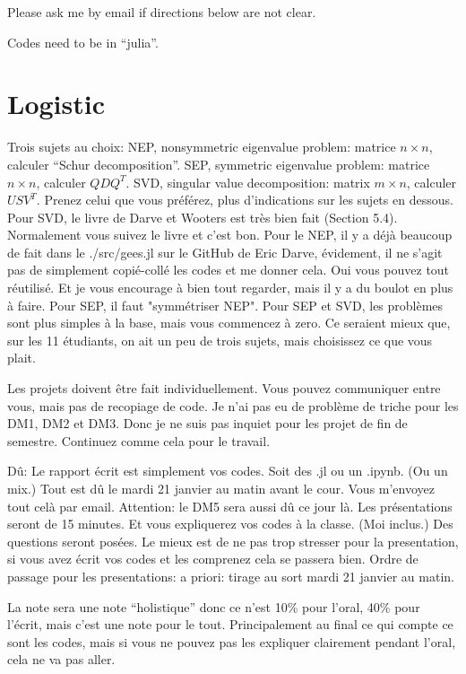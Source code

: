 \documentclass[11pt,letterpaper]{article}
\begin{document}
Please ask me by email if directions below are not clear.

Codes need to be in ``julia''.
 
\section*{Logistic}

Trois sujets au choix: NEP, nonsymmetric eigenvalue problem: matrice $n \times
n$, calculer ``Schur decomposition''.  SEP, symmetric eigenvalue problem:
matrice $n \times n$, calculer $Q D Q^T$.  SVD, singular value decomposition:
matrix $m \times n$, calculer $U S V ^T$.  Prenez celui que vous préférez, plus
d’indications sur les sujets en dessous. Pour SVD, le livre de Darve et Wooters
est très bien fait (Section 5.4). Normalement vous suivez le livre et c’est
bon. Pour le NEP, il y a déjà beaucoup de fait dans le ./src/gees.jl sur le
GitHub de Eric Darve, évidement, il ne s’agit pas de simplement copié-collé les
codes et me donner cela. Oui vous pouvez tout réutilisé. Et je vous encourage à
bien tout regarder, mais il y a du boulot en plus à faire. Pour SEP, il faut
"symmétriser NEP".  Pour SEP et SVD, les problèmes sont plus simples à la base,
mais vous commencez à zero. Ce seraient mieux que, sur les 11 étudiants, on ait
un peu de trois sujets, mais choisissez ce que vous plait.
 
Les projets doivent être fait individuellement. Vous pouvez communiquer entre
vous, mais pas de recopiage de code. Je n’ai pas eu de problème de triche pour
les DM1, DM2 et DM3. Donc je ne suis pas inquiet pour les projet de fin de
semestre. Continuez comme cela pour le travail.
 
Dû: Le rapport écrit est simplement vos codes. Soit des .jl ou un .ipynb. (Ou
un mix.) Tout est dû le mardi 21 janvier au matin avant le cour. Vous m’envoyez
tout celà par email. Attention: le DM5 sera aussi dû ce jour là.  Les
présentations seront de 15 minutes. Et vous expliquerez vos codes à la classe. (Moi
inclus.) Des questions seront posées. Le mieux est de ne pas trop stresser pour
la presentation, si vous avez écrit vos codes et les comprenez cela se passera
bien.  Ordre de passage pour les presentations: a priori: tirage au sort mardi
21 janvier au matin.

La note sera une note ``holistique'' donc ce n’est 10\% pour l’oral, 40\% pour
l’écrit, mais c’est une note pour le tout. Principalement au final ce qui
compte ce sont les codes, mais si vous ne pouvez pas les expliquer clairement
pendant l’oral, cela ne va pas aller.
 
\end{document}
